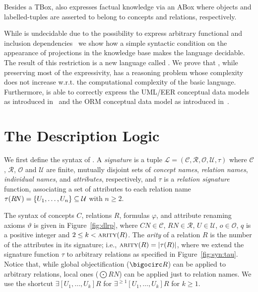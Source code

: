 \documentclass[draft]{article}
\newcommand{\greif}[1]{\ensuremath{\bigocirc#1}}
\newcommand{\lreif}[1]{\ensuremath{\bigodot#1}}
\newcommand{\Ob}{\ensuremath{\mathcal{O}}\xspace}
\begin{document}
Besides a TBox, \DLRp also expresses factual knowledge via an ABox where objects and labelled-tuples are asserted to belong to concepts and relations, respectively. 

While \DLRp is undecidable due to the possibility to express arbitrary functional and inclusion dependencies~\cite{Mitchell83,ChandraV85} we show how a simple syntactic condition on the appearance of projections in the knowledge base makes the language decidable. The result of this restriction is a new language called \DLRpm{}\negmedspace. We prove that \DLRpm{}\negmedspace, while preserving most of the \DLRp expressivity, has a reasoning problem whose complexity does not increase w.r.t. the computational complexity of the basic \DLR language. Furthermore, \DLRpm is able to correctly express the UML/EER conceptual data models as introduced in~\cite{BeCD05-AIJ-2005,ACKRZ:er07} and the ORM conceptual data model as introduced in~\cite{DBLP:conf/otm/FranconiM13}.



\section{The Description Logic \DLRp}
\label{sec:syntax}

We first define the syntax of \DLRp. A \DLRp \emph{signature} is a tuple $\mathcal{L}=(\mathcal{C},\mathcal{R},\mathcal{O},\mathcal{U},\tau)$ where $\mathcal{C}$, $\mathcal{R}$, $\mathcal{O}$ and $\mathcal{U}$ are finite, mutually disjoint sets of \emph{concept names}, \emph{relation names}, \emph{individual names}, and \emph{attributes}, respectively, and $\tau$ is a \emph{relation signature} function, associating a set of attributes to each relation name $\tau(R\!N)=\{U_1,\ldots,U_n\}\subseteq \mathcal{U}$ with $n\geq 2$.

The syntax of concepts $C$, relations $R$, formulas $\varphi$, and attribute renaming axioms $\vartheta$ is given in Figure~\ref{fig:dlrp}, where $C\!N\in\mathcal{C}$, $R\!N\in\mathcal{R}$, $U\in\mathcal{U}$, $o\in \Ob$, $q$ is a positive integer and $2\leq k < \textsc{arity}(R)$.  
The \emph{arity} of a relation  $R$ is the number of the attributes in its signature; i.e., $\textsc{arity}(R)=\left|\tau(R)\right|$, where we extend the signature function $\tau$ to arbitrary relations as specified in Figure~\ref{fig:syn:tau}.
Notice that, while global objectification ($\greif{R}$) can be applied to arbitrary relations, local ones ($\lreif{R\!N}$) can be applied just to relation names. We use the shortcut $\exists[U_1,\ldots,U_k] R$ for $\exists^{\geq 1}[U_1,\ldots,U_k] R$ for $k\geq 1$.
\end{document}
